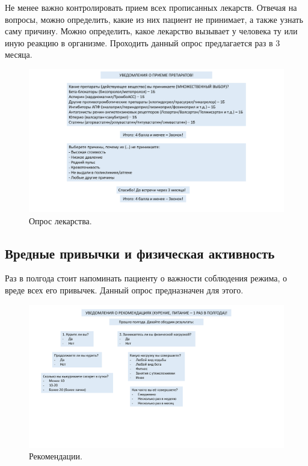 Не менее важно контролировать прием всех прописанных лекарств.
Отвечая на вопросы, можно определить, какие из них пациент не принимает, а также узнать саму причину.
Можно определить, какое лекарство вызывает у человека ту или иную реакцию в организме.
Проходить данный опрос предлагается раз в 3 месяца.

\begin{figure}[h]
    \includegraphics[scale=0.175]{images/presentation/1cbc101521d4d97c799189ce193d279d-1}
    \caption{Опрос лекарства.}\label{fig:figure2}
\end{figure}

\newpage

\subsection{Вредные привычки и физическая активность}\label{subsec:----}

Раз в полгода стоит напоминать пациенту о важности соблюдения режима, о вреде всех его привычек.
Данный опрос предназначен для этого.

\begin{figure}[h]
    \includegraphics[scale=0.175]{images/presentation/1cbc101521d4d97c799189ce193d279d-2}
    \caption{Рекомендации.}\label{fig:figure3}
\end{figure}